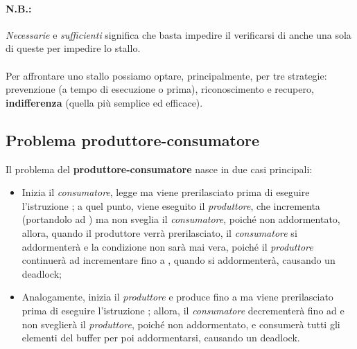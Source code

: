 \documentclass{article}
\begin{document}
\paragraph{N.B.:} \textit{Necessarie} e \textit{sufficienti} significa che basta impedire il verificarsi di anche una sola di queste per impedire lo stallo.

\paragraph{} Per affrontare uno stallo possiamo optare, principalmente, per tre strategie: prevenzione (a tempo di esecuzione o prima), riconoscimento e recupero, \textbf{indifferenza} (quella più semplice ed efficace).

\subsection{Problema produttore-consumatore} Il problema del \textbf{produttore-consumatore} nasce in due casi principali: \begin{itemize}
    \item Inizia il \textit{consumatore}, legge  ma viene prerilasciato prima di eseguire l'istruzione ; a quel punto, viene eseguito il \textit{produttore}, che incrementa  (portandolo ad ) ma non sveglia il \textit{consumatore}, poiché non addormentato, allora, quando il produttore verrà prerilasciato, il \textit{consumatore} si addormenterà e la condizione  non sarà mai vera, poiché il \textit{produttore} continuerà ad incrementare  fino a , quando si addormenterà, causando un deadlock;
    \item Analogamente, inizia il \textit{produttore} e produce fino a  ma viene prerilasciato prima di eseguire l'istruzione ; allora, il \textit{consumatore} decrementerà  fino ad  e non sveglierà il \textit{produttore}, poiché non addormentato, e consumerà tutti gli elementi del buffer per poi addormentarsi, causando un deadlock.
\end{itemize}
\end{document}
